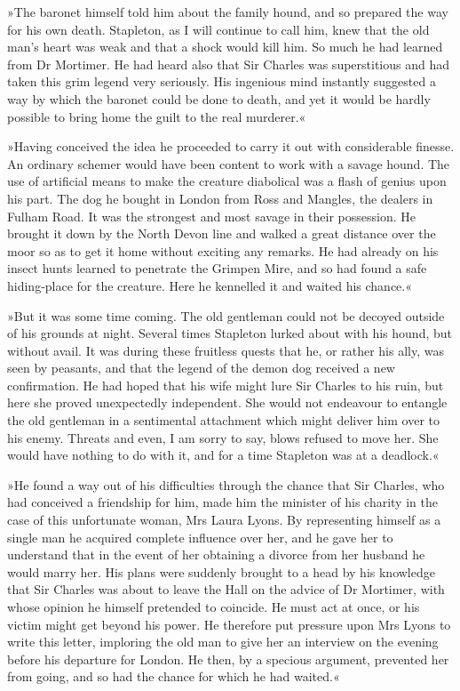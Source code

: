 »The baronet himself told him about the family hound, and so prepared the way for his own death. Stapleton, as I will continue to call him, knew that the old man's heart was weak and that a shock would kill him. So much he had learned from Dr Mortimer. He had heard also that Sir Charles was superstitious and had taken this grim legend very seriously. His ingenious mind instantly suggested a way by which the baronet could be done to death, and yet it would be hardly possible to bring home the guilt to the real murderer.«

»Having conceived the idea he proceeded to carry it out with considerable finesse. An ordinary schemer would have been content to work with a savage hound. The use of artificial means to make the creature diabolical was a flash of genius upon his part. The dog he bought in London from Ross and Mangles, the dealers in Fulham Road. It was the strongest and most savage in their possession. He brought it down by the North Devon line and walked a great distance over the moor so as to get it home without exciting any remarks. He had already on his insect hunts learned to penetrate the Grimpen Mire, and so had found a safe hiding-place for the creature. Here he kennelled it and waited his chance.«

»But it was some time coming. The old gentleman could not be decoyed outside of his grounds at night. Several times Stapleton lurked about with his hound, but without avail. It was during these fruitless quests that he, or rather his ally, was seen by peasants, and that the legend of the demon dog received a new confirmation. He had hoped that his wife might lure Sir Charles to his ruin, but here she proved unexpectedly independent. She would not endeavour to entangle the old gentleman in a sentimental attachment which might deliver him over to his enemy. Threats and even, I am sorry to say, blows refused to move her. She would have nothing to do with it, and for a time Stapleton was at a deadlock.«

»He found a way out of his difficulties through the chance that Sir Charles, who had conceived a friendship for him, made him the minister of his charity in the case of this unfortunate woman, Mrs Laura Lyons. By representing himself as a single man he acquired complete influence over her, and he gave her to understand that in the event of her obtaining a divorce from her husband he would marry her. His plans were suddenly brought to a head by his knowledge that Sir Charles was about to leave the Hall on the advice of Dr Mortimer, with whose opinion he himself pretended to coincide. He must act at once, or his victim might get beyond his power. He therefore put pressure upon Mrs Lyons to write this letter, imploring the old man to give her an interview on the evening before his departure for London. He then, by a specious argument, prevented her from going, and so had the chance for which he had waited.«

